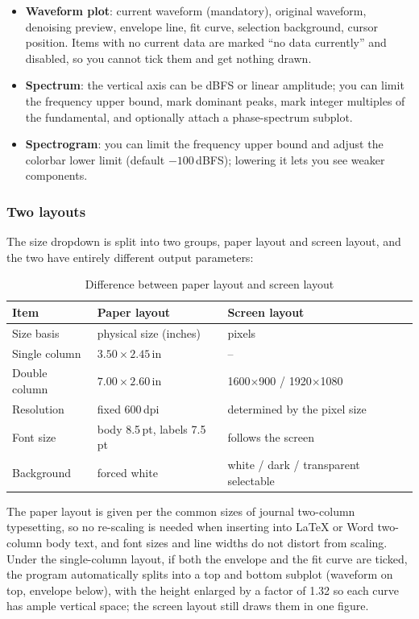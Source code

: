 \documentclass[UTF8,a4paper,12pt]{ctexart}
\begin{document}
\begin{itemize}
  \item \textbf{Waveform plot}: current waveform (mandatory), original waveform, denoising preview, envelope line, fit curve, selection background, cursor position. Items with no current data are marked ``no data currently'' and disabled, so you cannot tick them and get nothing drawn.
  \item \textbf{Spectrum}: the vertical axis can be dBFS or linear amplitude; you can limit the frequency upper bound, mark dominant peaks, mark integer multiples of the fundamental, and optionally attach a phase-spectrum subplot.
  \item \textbf{Spectrogram}: you can limit the frequency upper bound and adjust the colorbar lower limit (default $-100$\,dBFS); lowering it lets you see weaker components.
\end{itemize}

\subsubsection*{Two layouts}

The size dropdown is split into two groups, paper layout and screen layout, and the two have entirely different output parameters:

\begin{table}[htbp]
\centering
\caption{Difference between paper layout and screen layout}
\begin{tabular}{@{}lll@{}}
\toprule
Item & Paper layout & Screen layout \\
\midrule
Size basis & physical size (inches) & pixels \\
Single column & $3.50 \times 2.45$\,in & -- \\
Double column & $7.00 \times 2.60$\,in & 1600$\times$900 / 1920$\times$1080 \\
Resolution & fixed 600\,dpi & determined by the pixel size \\
Font size & body 8.5\,pt, labels 7.5\,pt & follows the screen \\
Background & forced white & white / dark / transparent selectable \\
\bottomrule
\end{tabular}
\end{table}

The paper layout is given per the common sizes of journal two-column typesetting, so no re-scaling is needed when inserting into \LaTeX{} or Word two-column body text, and font sizes and line widths do not distort from scaling. Under the single-column layout, if both the envelope and the fit curve are ticked, the program automatically splits into a top and bottom subplot (waveform on top, envelope below), with the height enlarged by a factor of 1.32 so each curve has ample vertical space; the screen layout still draws them in one figure.
\end{document}
